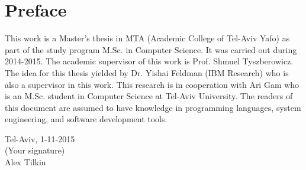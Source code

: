 \section*{Preface}
This work is a Master's thesis in MTA (Academic College of Tel-Aviv Yafo) as part of the study program M.Sc. in Computer Science. It was carried out during 2014-2015. The academic supervisor of this work is Prof. Shmuel Tyszberowicz. The idea for this thesis yielded by Dr. Yishai Feldman (IBM Research) who is also a supervisor in this work. This research is in cooperation with Ari Gam who is an M.Sc. student in Computer Science at Tel-Aviv University. The readers of this document are assumed to have knowledge in programming languages, system engineering, and software development tools.\\[2cm]

\begin{center}
Tel-Aviv, 1-11-2015\\[1pc]
(Your signature)\\[1pc]
Alex Tilkin
\end{center}